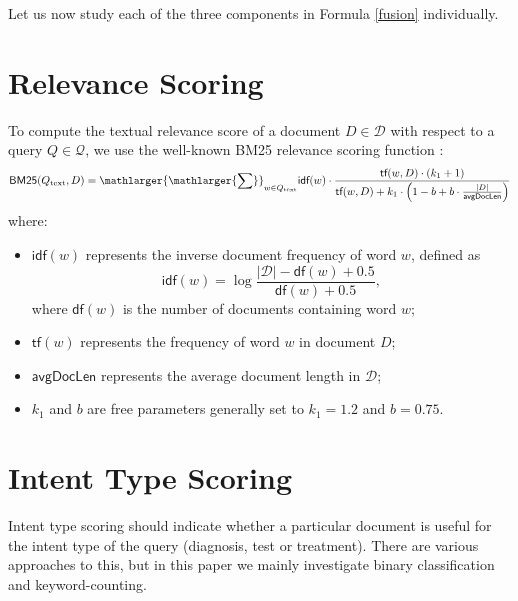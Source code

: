 Let us now study each of the three components in Formula \ref{fusion} individually.

\section{Relevance Scoring}
To compute the textual relevance score of a document $D\in\mathcal{D}$ with respect to a query $Q\in\mathcal{Q}$,
we use the well-known BM25 relevance scoring function \cite{bm25}:
\begin{equation}\label{bm25-formula}
\textsf{BM25}(Q_{\text{text}},D)
 = \displaystyle\mathlarger{\mathlarger{\sum}}_{w\in Q_{\text{text}}} \textsf{idf}(w)\cdot\displaystyle\frac{\textsf{tf}(w,D)\cdot(k_1+1)}{\textsf{tf}(w,D)+k_1\cdot\left(1-b+b\cdot\frac{|D|}{\textsf{avgDocLen}}\right)}
\end{equation}
where:
\begin{itemize}
 \item $\textsf{idf}(w)$ represents the inverse document frequency of word $w$, defined as
\[\textsf{idf}(w) = \log \displaystyle\frac{|\mathcal{D}|-\textsf{df}(w)+0.5}{\textsf{df}(w)+0.5},\]
where $\textsf{df}(w)$ is the number of documents containing word $w$;
\item $\textsf{tf}(w)$ represents the frequency of word $w$ in document $D$;
\item $\textsf{avgDocLen}$ represents the average document length in $\mathcal{D}$;
\item $k_1$ and $b$ are free parameters generally set to $k_1=1.2$ and $b=0.75$.
\end{itemize}

\section{Intent Type Scoring}\label{intent-scoring}
Intent type scoring should indicate whether a particular document is useful for the intent type of the query
(diagnosis, test or treatment). There are various approaches to this, but in this paper we mainly investigate
binary classification and keyword-counting.

